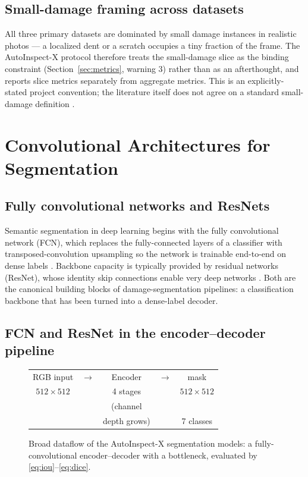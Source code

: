 \documentclass[conference]{IEEEtran}
\begin{document}
\subsection{Small-damage framing across datasets}
All three primary datasets are dominated by small damage instances in realistic
photos --- a localized dent or a scratch occupies a tiny fraction of the frame.
The AutoInspect-X protocol therefore treats the small-damage slice as the
binding constraint (Section~\ref{sec:metrics}, warning 3) rather than as an
afterthought, and reports slice metrics separately from aggregate metrics. This
is an explicitly-stated project convention; the literature itself does not
agree on a standard small-damage definition \cite{hasan2025}.

\section{Convolutional Architectures for Segmentation}
\label{sec:cnn}
\subsection{Fully convolutional networks and ResNets}
Semantic segmentation in deep learning begins with the fully convolutional
network (FCN), which replaces the fully-connected layers of a classifier with
transposed-convolution upsampling so the network is trainable end-to-end on
dense labels \cite{fcn2015}. Backbone capacity is typically provided by residual
networks (ResNet), whose identity skip connections enable very deep networks
\cite{resnet2016}. Both are the canonical building blocks of damage-segmentation
pipelines: a classification backbone that has been turned into a dense-label
decoder.

\subsection{FCN and ResNet in the encoder--decoder pipeline}
\begin{figure}[!t]
\begin{center}
\begin{tabular}{@{}c@{\ }c@{\ }c@{\ }c@{\ }c@{}}
RGB input & $\rightarrow$ & Encoder & $\rightarrow$ & mask \\
$512\times512$ & & 4 stages & & $512\times512$ \\
 & & (channel \\ & & depth grows) & & 7 classes \\
\end{tabular}
\end{center}
\caption{Broad dataflow of the AutoInspect-X segmentation models: a
fully-convolutional encoder--decoder with a bottleneck, evaluated by
\eqref{eq:iou}--\eqref{eq:dice}.}
\label{fig:fcn}
\end{figure}
\end{document}
